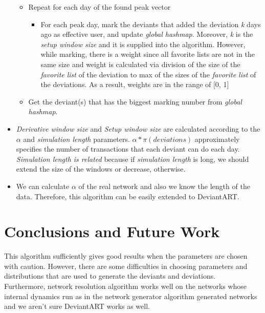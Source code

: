 \documentclass[12pt,a4paper]{report}
\begin{document}
\begin{itemize}
\begin{itemize}
		\item Repeat for each day of the found peak vector

			\begin{itemize}

			\item For each peak day, mark the deviants that added the deviation \emph{k} days ago as effective user, and update \emph{global hashmap}. Moreover, \emph{k} is the \emph{setup window size} and it is supplied into the algorithm. However, while marking, there is a weight since all favorite lists are not in the same size and weight is calculated via division of the size of the \emph{favorite list} of the deviation to max of the sizes of the \emph{favorite list} of the deviations. As a result, weights are in the range of [0, 1]

			\end{itemize}

		\item Get the deviant(s) that has the biggest marking number from \emph{global hashmap}. 	

		\end{itemize}

	\item \emph{Derivative window size} and \emph{Setup window size} are calculated according to the $\alpha$  and \emph{simulation length} parameters. $\alpha * \pi(deviations)$ approximately specifies the number of transactions that each deviant can do each day. \emph{Simulation length is related} because if \emph{simulation length} is long, we should extend the size of the windows or decrease, otherwise.

	\item We can calculate $\alpha$ of the real network and also we know the length of the data. Therefore, this algorithm can be easily extended to DeviantART.

	\end{itemize}
	

\chapter{Conclusions and Future Work}

	This algorithm sufficiently gives good results when the parameters are chosen with caution. However, there are some difficulties in choosing parameters and distributions that are used to generate the deviants and deviations. \\

	Furthermore, network resolution algorithm works well on the networks whose internal dynamics run as in the network generator algorithm generated networks and we aren't sure DeviantART works as well. \\
\end{document}
